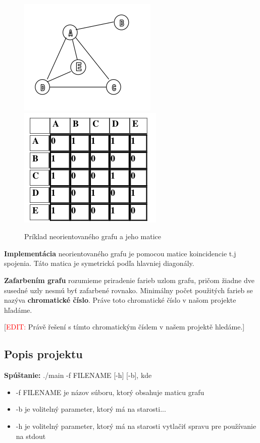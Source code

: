 \documentclass[a4paper,11pt]{article}
\begin{document}
\begin{figure}[h]
  \centering
  \includegraphics[scale=0.60]{neor_graf.png}\includegraphics[scale=0.58]{matrix_n_graf.png}
  \caption{Príklad neorientovaného grafu a jeho matice}
  \label{fig:graf}
\end{figure}

\textbf{Implementácia} neorientovaného grafu je pomocou matice koincidencie t.j spojenia. Táto matica je symetrická podľa hlavniej diagonály.

\textbf{Zafarbením grafu} rozumieme priradenie farieb uzlom grafu, pričom žiadne dve susedné uzly nesmú byť zafarbené rovnako. Minimálny počet použitých farieb se nazýva \textbf{chromatické číslo}. Práve toto chromatické číslo v našom projekte hľadáme. 

[\textcolor{red}{EDIT: }Právě řešení s tímto chromatickým číslem v našem projektě hledáme.]

\subsection{Popis projektu}
\textbf{Spúštanie:} ./main -f FILENAME [-h] [-b], kde
\begin{itemize}
    \item -f FILENAME je názov súboru, ktorý obsahuje maticu grafu
    \item -b je volitelný parameter, ktorý má na starosti...
    \item -h je volitelný parameter, ktorý má na starosti vytlačiť spravu pre používanie na stdout
\end{itemize}
\end{document}
